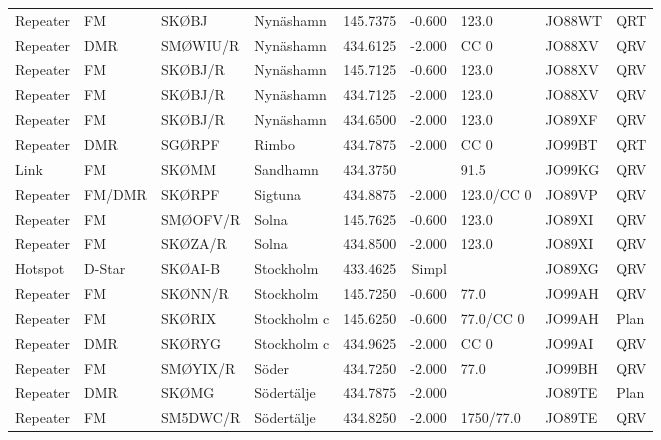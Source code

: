 \begin{landscape}
\begin{longtable}{llllrrlll}
Repeater & FM          & SKØBJ    & Nynäshamn   & 145.7375     & -0.600     & 123.0      & JO88WT      & QRT      \\
Repeater & DMR         & SMØWIU/R & Nynäshamn   & 434.6125     & -2.000     & CC 0       & JO88XV      & QRV      \\
Repeater & FM          & SKØBJ/R  & Nynäshamn   & 145.7125     & -0.600     & 123.0      & JO88XV      & QRV      \\
Repeater & FM          & SKØBJ/R  & Nynäshamn   & 434.7125     & -2.000     & 123.0      & JO88XV      & QRV      \\
Repeater & FM          & SKØBJ/R  & Nynäshamn   & 434.6500     & -2.000     & 123.0      & JO89XF      & QRV      \\
Repeater & DMR         & SGØRPF   & Rimbo       & 434.7875     & -2.000     & CC 0       & JO99BT      & QRT      \\
Link     & FM          & SKØMM    & Sandhamn    & 434.3750     &            & 91.5       & JO99KG      & QRV      \\
Repeater & FM/DMR      & SKØRPF   & Sigtuna     & 434.8875     & -2.000     & 123.0/CC 0 & JO89VP      & QRV      \\
Repeater & FM          & SMØOFV/R & Solna       & 145.7625     & -0.600     & 123.0      & JO89XI      & QRV      \\
Repeater & FM          & SKØZA/R  & Solna       & 434.8500     & -2.000     & 123.0      & JO89XI      & QRV      \\
Hotspot  & D-Star      & SKØAI-B  & Stockholm   & 433.4625     & Simpl      &            & JO89XG      & QRV      \\
Repeater & FM          & SKØNN/R  & Stockholm   & 145.7250     & -0.600     & 77.0       & JO99AH      & QRV      \\
Repeater & FM          & SKØRIX   & Stockholm c & 145.6250     & -0.600     & 77.0/CC 0  & JO99AH      & Plan     \\
Repeater & DMR         & SKØRYG   & Stockholm c & 434.9625     & -2.000     & CC 0       & JO99AI      & QRV      \\
Repeater & FM          & SMØYIX/R & Söder       & 434.7250     & -2.000     & 77.0       & JO99BH      & QRV      \\
Repeater & DMR         & SKØMG    & Södertälje  & 434.7875     & -2.000     &            & JO89TE      & Plan     \\
Repeater & FM          & SM5DWC/R & Södertälje  & 434.8250     & -2.000     & 1750/77.0  & JO89TE      & QRV      \\

\end{longtable}
\end{landscape}
